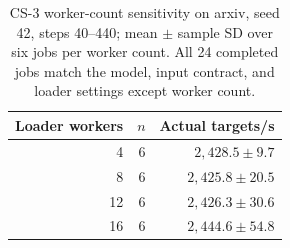 \begin{table}[t]
  \centering
  \small
  \setlength{\tabcolsep}{4pt}
  \caption{CS-3 worker-count sensitivity on arxiv, seed 42, steps 40--440; mean $\pm$ sample SD over six jobs per worker count. All 24 completed jobs match the model, input contract, and loader settings except worker count.}
  \label{tab:workers}
  \begin{tabular}{@{}rrr@{}}
    \hline
    Loader workers & $n$ & Actual targets/s \\
    \hline
    4 & 6 & $2,428.5 \pm 9.7$ \\
    8 & 6 & $2,425.8 \pm 20.5$ \\
    12 & 6 & $2,426.3 \pm 30.6$ \\
    16 & 6 & $2,444.6 \pm 54.8$ \\
    \hline
  \end{tabular}
\end{table}
